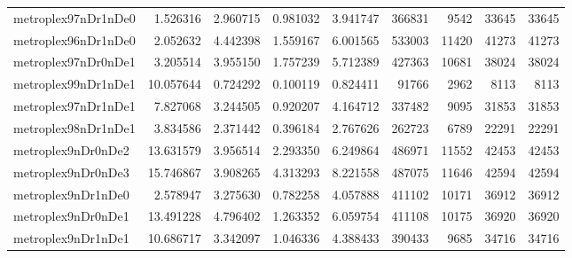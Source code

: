 \begin{longtable}{|l|r|r|r|r|r|r|r|r|}
metroplex97nDr1nDe0 & 1.526316 & 2.960715 & 0.981032 & 3.941747 & 366831 & 9542 & 33645 & 33645 \\
metroplex96nDr1nDe0 & 2.052632 & 4.442398 & 1.559167 & 6.001565 & 533003 & 11420 & 41273 & 41273 \\
metroplex97nDr0nDe1 & 3.205514 & 3.955150 & 1.757239 & 5.712389 & 427363 & 10681 & 38024 & 38024 \\
metroplex99nDr1nDe1 & 10.057644 & 0.724292 & 0.100119 & 0.824411 & 91766 & 2962 & 8113 & 8113 \\
metroplex97nDr1nDe1 & 7.827068 & 3.244505 & 0.920207 & 4.164712 & 337482 & 9095 & 31853 & 31853 \\
metroplex98nDr1nDe1 & 3.834586 & 2.371442 & 0.396184 & 2.767626 & 262723 & 6789 & 22291 & 22291 \\
metroplex9nDr0nDe2 & 13.631579 & 3.956514 & 2.293350 & 6.249864 & 486971 & 11552 & 42453 & 42453 \\
metroplex9nDr0nDe3 & 15.746867 & 3.908265 & 4.313293 & 8.221558 & 487075 & 11646 & 42594 & 42594 \\
metroplex9nDr1nDe0 & 2.578947 & 3.275630 & 0.782258 & 4.057888 & 411102 & 10171 & 36912 & 36912 \\
metroplex9nDr0nDe1 & 13.491228 & 4.796402 & 1.263352 & 6.059754 & 411108 & 10175 & 36920 & 36920 \\
metroplex9nDr1nDe1 & 10.686717 & 3.342097 & 1.046336 & 4.388433 & 390433 & 9685 & 34716 & 34716 \\
\end{longtable}
